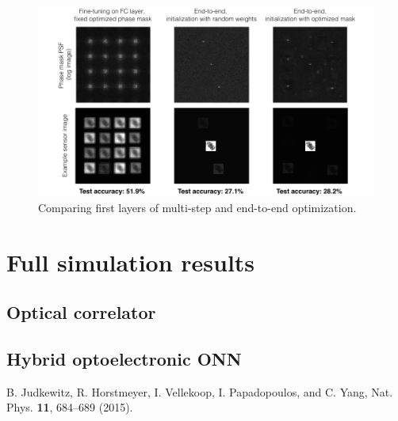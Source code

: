 \documentclass{article}
\begin{document}
\begin{figure}[h]
\centering
\includegraphics[width=\linewidth]{hybrid_e2e.pdf}
\caption{Comparing first layers of multi-step and end-to-end optimization.}
\label{fig:end2end}
\end{figure}


\section{Full simulation results}

\subsection{Optical correlator}

\subsection{Hybrid optoelectronic ONN}




\pagebreak
\begin{thebibliography}{00}

 B. Judkewitz, R. Horstmeyer, I. Vellekoop, I. Papadopoulos, and C. Yang, Nat. Phys. \textbf{11}, 684--689 (2015). 


\end{thebibliography}
\end{document}
